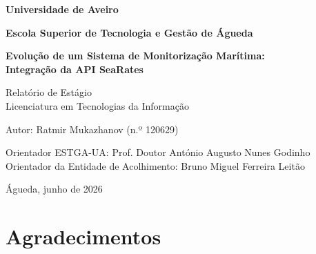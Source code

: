 \documentclass[a4paper,12pt]{report}
\begin{document}
\thispagestyle{empty}
\begin{center}

  \vspace*{3cm}

  {\fontsize{18}{22}\selectfont\bfseries
    Universidade de Aveiro\par}
  {\fontsize{14}{17}\selectfont\bfseries
    Escola Superior de Tecnologia e Gestão de Águeda\par}

  \vspace{2cm}

  {\fontsize{20}{24}\selectfont\bfseries
    Evolução de um Sistema de Monitorização Marítima:\\
    Integração da API SeaRates\par}


  \vspace{1.5cm}

  {\fontsize{14}{17}\selectfont
    Relatório de Estágio\\
    Licenciatura em Tecnologias da Informação\par}

  \vspace{2cm}

  {\fontsize{13}{16}\selectfont
    Autor: Ratmir Mukazhanov (n.º 120629)\par}

  \vspace{1.5cm}

  {\fontsize{12}{15}\selectfont
    Orientador ESTGA-UA: Prof. Doutor António Augusto Nunes Godinho\\
    Orientador da Entidade de Acolhimento: Bruno Miguel Ferreira Leitão\par}

  \vfill

  {\fontsize{12}{15}\selectfont
    Águeda, junho de 2026\par}

\end{center}

\newpage
\hypersetup{pageanchor=true}
\setcounter{page}{4}

\chapter*{Agradecimentos}
\end{document}
